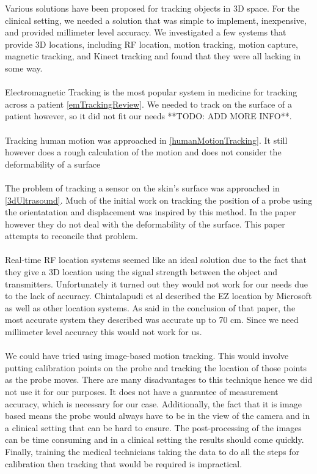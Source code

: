 Various solutions have been proposed for tracking objects in 3D space. For the clinical setting, we needed a solution that was simple to implement, inexpensive, and provided millimeter level accuracy. We investigated a few systems that provide 3D locations, including RF location, motion tracking, motion capture, magnetic tracking, and Kinect tracking and found that they were all lacking in some way. \\
\\
Electromagnetic Tracking is the most popular system in medicine for tracking across a patient \ref{emTrackingReview}. We needed to track on the surface of a patient however, so it did not fit our needs **TODO: ADD MORE INFO**. \\
\\
Tracking human motion was approached in \ref{humanMotionTracking}. It still however does a rough calculation of the motion and does not consider the deformability of a surface\\
\\
The problem of tracking a sensor on the skin's surface was approached in \ref{3dUltrasound}. Much of the initial work on tracking the position of a probe using the orientatation and displacement was inspired by this method. In the paper however they do not deal with the deformability of the surface. This paper attempts to reconcile that problem. \\
\\
Real-time RF location systems seemed like an ideal solution due to the fact that they give a 3D location using the signal strength between the object and transmitters. Unfortunately it turned out they would not work for our needs due to the lack of accuracy. Chintalapudi et al \cite{ezlocation} described the EZ location by Microsoft as well as other location systems. As said in the conclusion of that paper, the most accurate system they described was accurate up to 70 cm. Since we need millimeter level accuracy this would not work for us. \\
\\
We could have tried using image-based motion tracking. This would involve putting calibration points on the probe and tracking the location of those points as the probe moves. There are many disadvantages to this technique hence we did not use it for our purposes. It does not have a guarantee of measurement accuracy, which is necessary for our case. Additionally, the fact that it is image based means the probe would always have to be in the view of the camera and in a clinical setting that can be hard to ensure. The post-processing of the images can be time consuming and in a clinical setting the results should come quickly. Finally, training the medical technicians taking the data to do all the steps for calibration then tracking that would be required is impractical. \\
